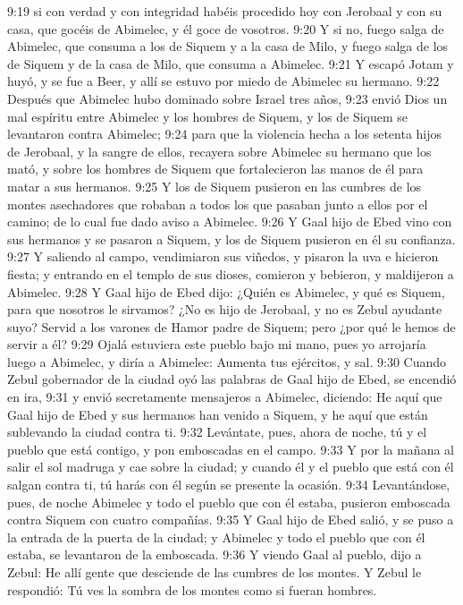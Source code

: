 9:19 si con verdad y con integridad habéis procedido hoy con Jerobaal y con su casa, que gocéis de Abimelec, y él goce de vosotros.  
9:20 Y si no, fuego salga de Abimelec, que consuma a los de Siquem y a la casa de Milo, y fuego salga de los de Siquem y de la casa de Milo, que consuma a Abimelec.  
9:21 Y escapó Jotam y huyó, y se fue a Beer, y allí se estuvo por miedo de Abimelec su hermano.  
9:22 Después que Abimelec hubo dominado sobre Israel tres años,  
9:23 envió Dios un mal espíritu entre Abimelec y los hombres de Siquem, y los de Siquem se levantaron contra Abimelec;  
9:24 para que la violencia hecha a los setenta hijos de Jerobaal, y la sangre de ellos, recayera sobre Abimelec su hermano que los mató, y sobre los hombres de Siquem que fortalecieron las manos de él para matar a sus hermanos.  
9:25 Y los de Siquem pusieron en las cumbres de los montes asechadores que robaban a todos los que pasaban junto a ellos por el camino; de lo cual fue dado aviso a Abimelec.  
9:26 Y Gaal hijo de Ebed vino con sus hermanos y se pasaron a Siquem, y los de Siquem pusieron en él su confianza.  
9:27 Y saliendo al campo, vendimiaron sus viñedos, y pisaron la uva e hicieron fiesta; y entrando en el templo de sus dioses, comieron y bebieron, y maldijeron a Abimelec.  
9:28 Y Gaal hijo de Ebed dijo: ¿Quién es Abimelec, y qué es Siquem, para que nosotros le sirvamos? ¿No es hijo de Jerobaal, y no es Zebul ayudante suyo? Servid a los varones de Hamor padre de Siquem; pero ¿por qué le hemos de servir a él?  
9:29 Ojalá estuviera este pueblo bajo mi mano, pues yo arrojaría luego a Abimelec, y diría a Abimelec: Aumenta tus ejércitos, y sal.  
9:30 Cuando Zebul gobernador de la ciudad oyó las palabras de Gaal hijo de Ebed, se encendió en ira,  
9:31 y envió secretamente mensajeros a Abimelec, diciendo: He aquí que Gaal hijo de Ebed y sus hermanos han venido a Siquem, y he aquí que están sublevando la ciudad contra ti.  
9:32 Levántate, pues, ahora de noche, tú y el pueblo que está contigo, y pon emboscadas en el campo.  
9:33 Y por la mañana al salir el sol madruga y cae sobre la ciudad; y cuando él y el pueblo que está con él salgan contra ti, tú harás con él según se presente la ocasión.  
9:34 Levantándose, pues, de noche Abimelec y todo el pueblo que con él estaba, pusieron emboscada contra Siquem con cuatro compañías.  
9:35 Y Gaal hijo de Ebed salió, y se puso a la entrada de la puerta de la ciudad; y Abimelec y todo el pueblo que con él estaba, se levantaron de la emboscada. 
9:36 Y viendo Gaal al pueblo, dijo a Zebul: He allí gente que desciende de las cumbres de los montes. Y Zebul le respondió: Tú ves la sombra de los montes como si fueran hombres.  
